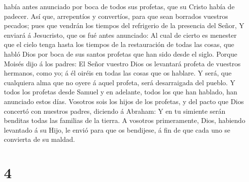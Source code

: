 había antes anunciado por boca de todos sus profetas, que su Cristo
había de padecer.  Así que, arrepentíos y convertíos,
para que sean borrados vuestros pecados; pues que vendrán los tiempos
del refrigerio de la presencia del Señor,  Y enviará á
Jesucristo, que os fué antes anunciado:  Al cual de
cierto es menester que el cielo tenga hasta los tiempos de la
restauración de todas las cosas, que habló Dios por boca de sus santos
profetas que han sido desde el siglo.  Porque Moisés dijo
á los padres: El Señor vuestro Dios os levantará profeta de vuestros
hermanos, como yo; á él oiréis en todas las cosas que os hablare.
 Y será, que cualquiera alma que no oyere á aquel
profeta, será desarraigada del pueblo.  Y todos los
profetas desde Samuel y en adelante, todos los que han hablado, han
anunciado estos días.  Vosotros sois los hijos de los
profetas, y del pacto que Dios concertó con nuestros padres, diciendo á
Abraham: Y en tu simiente serán benditas todas las familias de la
tierra.  A vosotros primeramente, Dios, habiendo
levantado á su Hijo, le envió para que os bendijese, á fin de que cada
uno se convierta de su maldad.

\hypertarget{section-3}{%
\section{4}\label{section-3}}

